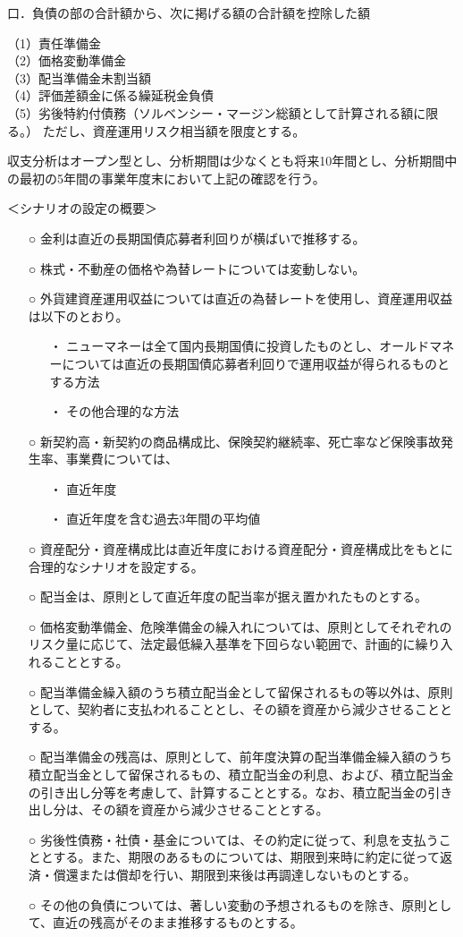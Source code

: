 \documentclass[report,gutter=10mm,fore-edge=10mm,uplatex,dvipdfmx]{jlreq}
\begin{document}
口．負債の部の合計額から、次に掲げる額の合計額を控除した額

（1）責任準備金\\
（2）価格変動準備金\\
（3）配当準備金未割当額\\
（4）評価差額金に係る繰延税金負債\\
（5）劣後特約付債務（ソルベンシー・マージン総額として計算される額に限る。）
ただし、資産運用リスク相当額を限度とする。

収支分析はオープン型とし、分析期間は少なくとも将来10年間とし、分析期間中の最初の5年間の事業年度末において上記の確認を行う。

＜シナリオの設定の概要＞

\begin{itemize}
\item[○] 金利は直近の長期国債応募者利回りが横ばいで推移する。
\item[○] 株式・不動産の価格や為替レートについては変動しない。
\item[○] 外貨建資産運用収益については直近の為替レートを使用し、資産運用収益は以下のとおり。
\begin{itemize}
\item[・] ニューマネーは全て国内長期国債に投資したものとし、オールドマネーについては直近の長期国債応募者利回りで運用収益が得られるものとする方法
\item[・] その他合理的な方法
\end{itemize}
\item[○] 新契約高・新契約の商品構成比、保険契約継続率、死亡率など保険事故発生率、事業費については、
\begin{itemize}
\item[・] 直近年度
\item[・] 直近年度を含む過去3年間の平均値
\end{itemize}
\item[○] 資産配分・資産構成比は直近年度における資産配分・資産構成比をもとに合理的なシナリオを設定する。
\item[○] 配当金は、原則として直近年度の配当率が据え置かれたものとする。
\item[○] 価格変動準備金、危険準備金の繰入れについては、原則としてそれぞれのリスク量に応じて、法定最低繰入基準を下回らない範囲で、計画的に繰り入れることとする。
\item[○] 配当準備金繰入額のうち積立配当金として留保されるもの等以外は、原則として、契約者に支払われることとし、その額を資産から減少させることとする。
\item[○] 配当準備金の残高は、原則として、前年度決算の配当準備金繰入額のうち積立配当金として留保されるもの、積立配当金の利息、および、積立配当金の引き出し分等を考慮して、計算することとする。なお、積立配当金の引き出し分は、その額を資産から減少させることとする。
\item[○] 劣後性債務・社債・基金については、その約定に従って、利息を支払うこととする。また、期限のあるものについては、期限到来時に約定に従って返済・償還または償却を行い、期限到来後は再調達しないものとする。
\item[○] その他の負債については、著しい変動の予想されるものを除き、原則として、直近の残高がそのまま推移するものとする。
\end{itemize}
\end{document}
